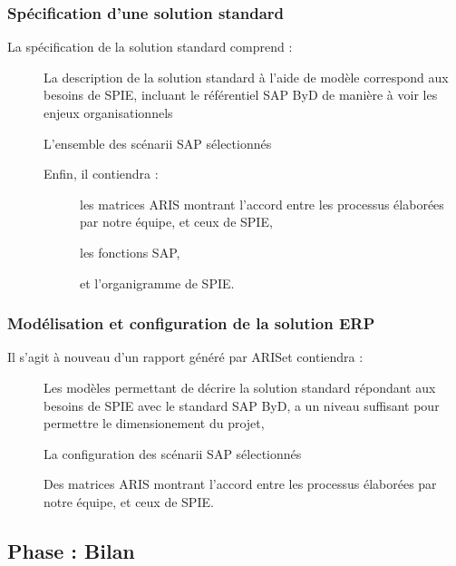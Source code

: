 \subsubsection{Spécification d’une solution standard}

La spécification de la solution standard comprend : \\
\begin{description}
    \item[\textbullet] La description de la solution standard à l’aide de modèle correspond aux besoins de SPIE, incluant le référentiel SAP ByD de manière à voir les enjeux organisationnels
    \item[\textbullet] L’ensemble des scénarii SAP sélectionnés
    \item[\textbullet] Enfin, il contiendra :
        \begin{description}
            \item[\textbullet] les matrices ARIS montrant l’accord entre les processus élaborées par notre équipe, et ceux de SPIE,
            \item[\textbullet] les fonctions SAP,
            \item[\textbullet] et l’organigramme de SPIE.
        \end{description}
\end{description}

\subsubsection{Modélisation et configuration de la solution ERP}

Il s’agit à nouveau d’un rapport généré par ARISet contiendra : \\

\begin{description}
    \item[\textbullet] Les modèles permettant de décrire la solution standard répondant aux besoins de SPIE avec le standard SAP ByD, a un niveau suffisant pour permettre le dimensionement du projet, 
    \item[\textbullet] La configuration des scénarii SAP sélectionnés 
    \item[\textbullet] Des matrices ARIS montrant l’accord entre les processus élaborées par notre équipe, et ceux de SPIE.
\end{description}

\subsection{Phase : Bilan}

